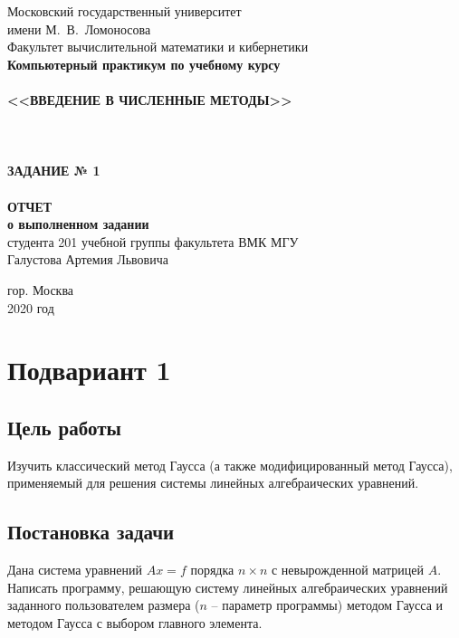 \documentclass[a4paper,12pt,titlepage,finall]{article}
\begin{document}
\begin{titlepage}
    \begin{center}
	{\small \sc Московский государственный университет \\имени М.~В.~Ломоносова\\
	Факультет вычислительной математики и кибернетики\\}
	\hrulefill
	\vfill
	{\large \bf Компьютерный практикум по учебному курсу}\\
	~\\
	{\Large \bf <<ВВЕДЕНИЕ В ЧИСЛЕННЫЕ МЕТОДЫ>>}\\ 
	~\\
	~\\
	~\\
	{\Large \bf ЗАДАНИЕ № 1}\\
	~\\
	{\large \bf ОТЧЕТ}\\
	{\bf о выполненном задании}\\
	{студента 201 учебной группы факультета ВМК МГУ}\\
	{Галустова Артемия Львовича}
    \end{center}
    
    \begin{center}
	\vfill
	{\small гор. Москва\\2020 год}
    \end{center}
\end{titlepage}

\tableofcontents
\newpage

\section{Подвариант 1}
\subsection{Цель работы}

Изучить классический метод Гаусса (а также модифицированный метод Гаусса),
применяемый для решения системы линейных алгебраических уравнений.

\subsection{Постановка задачи}

Дана система уравнений $Ax=f$ порядка $n \times n$ с невырожденной матрицей $A$. Написать
программу, решающую систему линейных алгебраических уравнений заданного
пользователем размера ($n$ – параметр программы) методом Гаусса и методом Гаусса с
выбором главного элемента.
\end{document}
